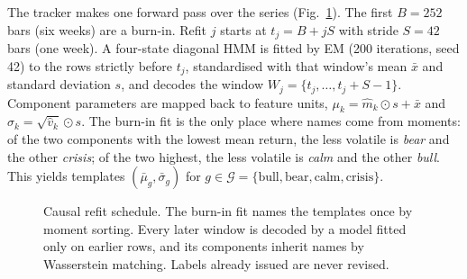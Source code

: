 \documentclass[conference]{IEEEtran}
\newcommand{\G}{\mathcal{G}}
\DeclareMathOperator*{\argmin}{arg\,min}
\begin{document}
The tracker makes one forward pass over the series (Fig.~\ref{fig:timeline}). The first $B=252$ bars (six weeks) are a burn-in. Refit $j$ starts at $t_j=B+jS$ with stride $S=42$ bars (one week). A four-state diagonal HMM is fitted by EM (200 iterations, seed 42) to the rows strictly before $t_j$, standardised with that window's mean $\bar x$ and standard deviation $s$, and decodes the window $W_j=\{t_j,\dots,t_j+S-1\}$. Component parameters are mapped back to feature units, $\mu_k=\hat m_k\odot s+\bar x$ and $\sigma_k=\sqrt{\hat v_k}\odot s$. The burn-in fit is the only place where names come from moments: of the two components with the lowest mean return, the less volatile is \emph{bear} and the other \emph{crisis}; of the two highest, the less volatile is \emph{calm} and the other \emph{bull}. This yields templates $(\bar\mu_g,\bar\sigma_g)$ for $g\in\G=\{\text{bull},\text{bear},\text{calm},\text{crisis}\}$.

\begin{figure}[t]
\centering
{}
\caption{Causal refit schedule. The burn-in fit names the templates once by moment sorting. Every later window is decoded by a model fitted only on earlier rows, and its components inherit names by Wasserstein matching. Labels already issued are never revised.}
\label{fig:timeline}
\end{figure}
\end{document}
